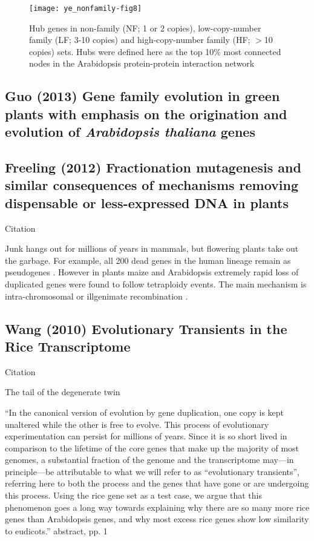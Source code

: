     \begin{figure}[!hbpt] \centering \texttt{[image: ye\_nonfamily-fig8]}
        \caption{ Hub genes in non-family (NF; 1 or 2 copies),
            low-copy-number family (LF; 3-10 copies) and high-copy-number
            family (HF; $>$10 copies) sets. Hubs were defined here as the
            top 10\% most connected nodes in the Arabidopsis
        protein-protein interaction network } \end{figure} \FloatBarrier

\subsection{Guo (2013) Gene family evolution in green plants with emphasis
    on the origination and evolution of \textit{Arabidopsis thaliana}
genes}

\subsection{Freeling (2012) Fractionation mutagenesis and similar consequences
    of mechanisms removing dispensable or less-expressed {DNA} in plants}

    Citation \cite{freeling_fractionation_2012}

    Junk hangs out for millions of years in mammals, but flowering plants take
    out the garbage. For example, all 200 dead genes in the human lineage
    remain as pseudogenes \cite{schrider_all_2009}. However in plants maize
    \cite{woodhouse_following_2010} and Arabidopsis
    \cite{thomas_following_2006} extremely rapid loss of duplicated genes were
    found to follow tetraploidy events. The main mechanism is intra-chromosomal
    or illgenimate recombination \cite{woodhouse_following_2010}.

\subsection{Wang (2010) Evolutionary Transients in the Rice Transcriptome}

    Citation \cite{wang_evolutionary_2010}

    The tail of the degenerate twin

    ``In the canonical version of evolution by gene duplication, one copy
    is kept unaltered while the other is free to evolve. This process of
    evolutionary experimentation can persist for millions of years. Since
    it is so short lived in comparison to the lifetime of the core genes
    that make up the majority of most genomes, a substantial fraction of
    the genome and the transcriptome may—in principle—be attributable to
    what we will refer to as “evolutionary transients”, referring here to
    both the process and the genes that have gone or are undergoing this
    process. Using the rice gene set as a test case, we argue that this
    phenomenon goes a long way towards explaining why there are so many
    more rice genes than Arabidopsis genes, and why most excess rice genes
    show low similarity to eudicots.'' abstract, pp. 1

